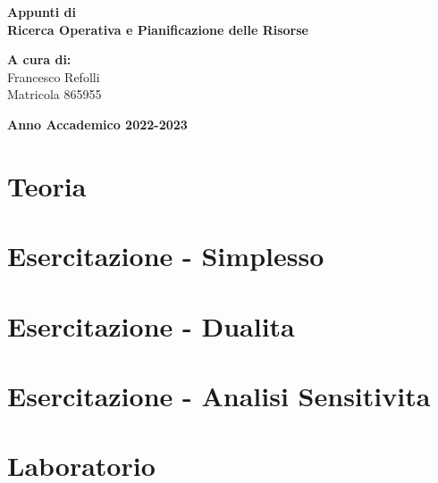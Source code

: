 \documentclass[a4paper,12pt,oneside]{book}
\begin{document}
    
    \begin{titlepage}
        
	\vspace{40mm}
        
	\begin{center}
            {\LARGE{
                    \textbf{Appunti di \\ Ricerca Operativa e Pianificazione delle Risorse}
                    \par
            }}
        \end{center}
        
        \vspace{50mm}

        \begin{flushright}
            {\large \textbf{A cura di:}} \\
            \large{Francesco Refolli} \\
            \large{Matricola 865955} 
        \end{flushright}
        
        \vspace{40mm}
        \begin{center}
            {\large{\bf Anno Accademico 2022-2023}}
        \end{center}

        \restoregeometry
        
    \end{titlepage}
    
    \printindex
    

    \part{Teoria}
    
    
    
    
    
    \part{Esercitazione - Simplesso}
    \part{Esercitazione - Dualita}
    \part{Esercitazione - Analisi Sensitivita}
    

    \part{Laboratorio}
    
    
    
\end{document}
